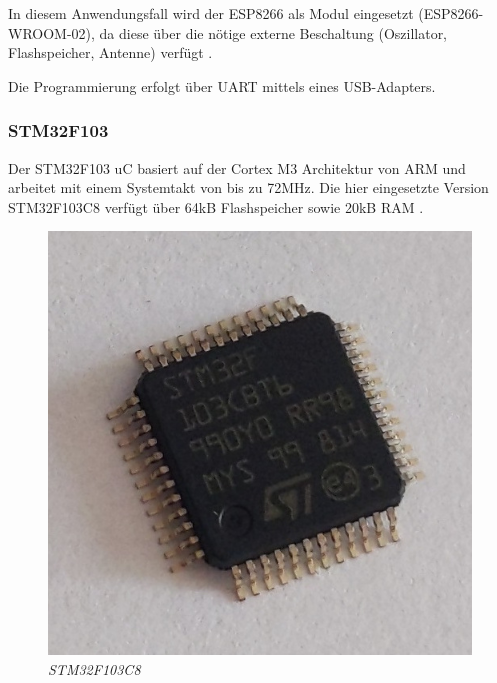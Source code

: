 \smallskip

In diesem Anwendungsfall wird der ESP8266 als Modul eingesetzt (ESP8266-WROOM-02), da diese über die nötige externe Beschaltung (Oszillator, Flashspeicher, Antenne)
verfügt \citep{ESP8266_Datasheet}.

\smallskip

Die Programmierung erfolgt über \acs{UART} mittels eines USB-Adapters.

\subsubsection{STM32F103}

Der STM32F103 \ac{uC} basiert auf der Cortex M3 Architektur von ARM und arbeitet mit einem Systemtakt von bis zu 72MHz. Die hier eingesetzte 
Version STM32F103C8 verfügt über 64kB Flashspeicher sowie 20kB \acs{RAM} \citep{STM32_Datasheet}.

\begin{figure}
     \vspace{-\baselineskip}
         \centering
         \includegraphics[scale=0.8]{Pictures/stm32f103.jpg}
         \caption{\textit{STM32F103C8}}
         \label{img:STM32F103C8}
 \end{figure}

